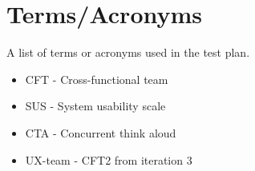 \section{Terms/Acronyms}
\noindent A list of terms or acronyms used in the test plan.\newline  
\begin{itemize}
  \item CFT - Cross-functional team
  \item SUS - System usability scale
  \item CTA - Concurrent think aloud
  \item UX-team - CFT2 from iteration 3
\end{itemize}